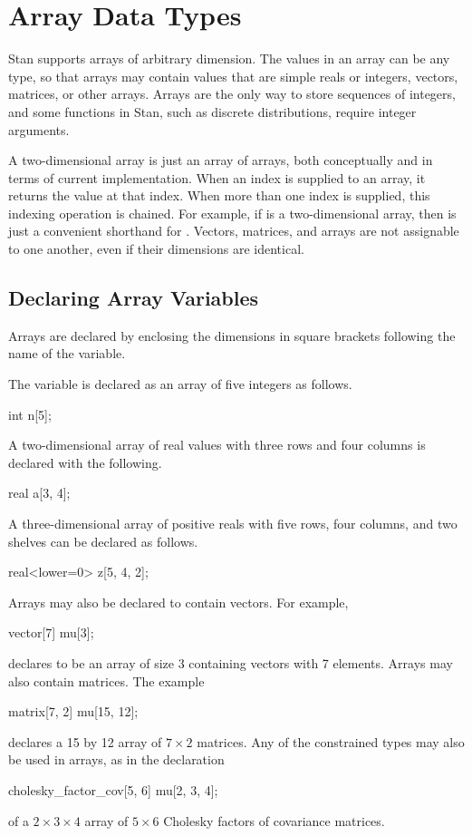 \section{Array Data Types}\label{array-data-types.section}

Stan supports arrays of arbitrary dimension.  The values in an array
can be any type, so that arrays may contain values that are simple
reals or integers, vectors, matrices, or other arrays.  Arrays are the
only way to store sequences of integers, and some functions in Stan,
such as discrete distributions, require integer arguments.

A two-dimensional array is just an array of arrays, both conceptually
and in terms of current implementation.  When an index is supplied to
an array, it returns the value at that index.  When more than one
index is supplied, this indexing operation is chained.  For example, if
 is a two-dimensional array, then  is just
a convenient shorthand for .
%
Vectors, matrices, and arrays are not assignable to one another, even
if their dimensions are identical.

\subsection{Declaring Array Variables}

Arrays are declared by enclosing the dimensions in square brackets
following the name of the variable.

The variable  is declared as an array of five integers as follows.
%
\begin{stancode}
int n[5];
\end{stancode}
%
A two-dimensional array of real values with three rows and four columns is
declared with the following.
%
\begin{stancode}
real a[3, 4];
\end{stancode}
%
A three-dimensional array  of positive reals with five rows, four
columns, and two shelves can be declared as follows.
%
\begin{stancode}
real<lower=0> z[5, 4, 2];
\end{stancode}
%

Arrays may also be declared to contain vectors.  For example,
%
\begin{stancode}
vector[7] mu[3];
\end{stancode}
%
declares  to be an array of size 3 containing vectors with 7
elements.  Arrays may also contain matrices.  The example
%
\begin{stancode}
matrix[7, 2] mu[15, 12];
\end{stancode}
%
declares a 15 by 12 array of $7 \times 2$ matrices.
Any of the constrained types may also be used in arrays, as in the
declaration
%
\begin{stancode}
cholesky_factor_cov[5, 6] mu[2, 3, 4];
\end{stancode}
%
of a $2 \times 3 \times 4$ array of $5 \times 6$ Cholesky factors of
covariance matrices.

